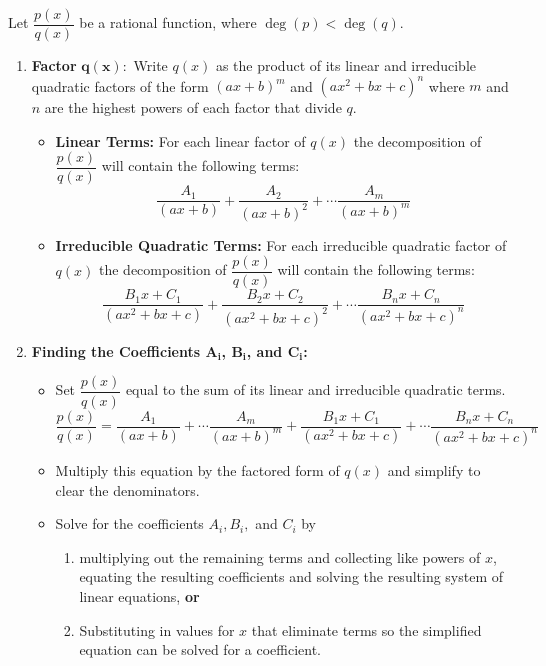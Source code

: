 \setboxwidth{60pt}
{Let $\dfrac{p(x)}{q(x)}$ be a rational function, where $\deg(p)<\deg(q)$.
\begin{enumerate}
	\item \textbf {Factor} $\mathbf{q(x):}$ Write $q(x)$ as the product of its linear and irreducible quadratic factors of the form $(ax+b)^m$ and $(ax^2+bx+c)^n$ where $m$ and $n$ are the highest powers of each factor that divide $q$.
	\begin{itemize}
		\item \textbf{Linear Terms:} For each linear factor of $q(x)$ the decomposition of $\dfrac{p(x)}{q(x)}$ will contain the following terms:
		\[\frac{A_1}{(ax+b)}+\frac {A_2}{(ax+b)^2}+\dotsb\frac{A_m}{(ax+b)^m}\]
		\item \textbf{Irreducible Quadratic Terms:}  For each irreducible quadratic factor of $q(x)$ the decomposition of $\dfrac {p(x)}{q(x)}$ will contain the following terms:
		\[
		 \dfrac{B_1x+C_1}{(ax^2+bx+c)}+\frac{B_2x+C_2}{(ax^2+bx+c)^2}
		 +\dotsb\frac{B_nx+C_n}{(ax^2+bx+c)^n}
		\]
	\end{itemize}
	\item \textbf{Finding the Coefficients $\mathbf{A_i}$, $\mathbf{B_i}$, and $\mathbf{C_i}$:}
	\begin{itemize}
		\item Set $\dfrac{p(x)}{q(x)}$ equal to the sum of its linear and irreducible quadratic terms.
		\[
		 \frac{p(x)}{q(x)}
		 =\frac{A_1}{(ax+b)}+\dotsb\frac{A_m}{(ax+b)^m}
		 +\frac{B_1x+C_1}{(ax^2+bx+c)}+\dotsb\frac{B_nx+C_n}{(ax^2+bx+c)^n}
		\]
		\item Multiply this equation by the factored form of $q(x)$ and simplify to clear the denominators. 
		\item Solve for the coefficients $A_i, B_i,$ and $C_i$ by
		\begin{enumerate}[label=(\alph*)]
			\item multiplying out the remaining terms and collecting like powers of $x$, equating the resulting coefficients and solving the resulting system of linear equations, \textbf{or}
			\item Substituting in values for $x$ that eliminate terms so the simplified equation can be solved for a coefficient.
		\end{enumerate}
	\end{itemize}
\end{enumerate}}


